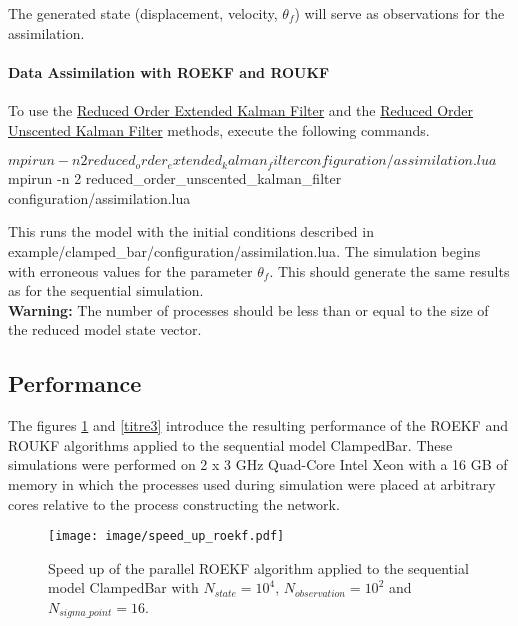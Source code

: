 \documentclass{tufte-book}
\begin{document}
\-The generated state (displacement, velocity, $ \theta_{f} $) will serve as observations for the assimilation.



\hypertarget{par-seq-example-dam}{}\paragraph{Data Assimilation with ROEKF and ROUKF}\label{par-seq-example-dam}


\-To use the \hyperlink{reduced_order_extended_kalman_filter}{\-Reduced \-Order \-Extended \-Kalman \-Filter} and the \hyperlink{reduced_order_unscented_kalman_filter}{\-Reduced \-Order \-Unscented \-Kalman \-Filter} methods, execute the following commands.
\begin{frame_bash}
$ mpirun -n 2 reduced_order_extended_kalman_filter configuration/assimilation.lua
$ mpirun -n 2 reduced_order_unscented_kalman_filter configuration/assimilation.lua
\end{frame_bash}
  \-This runs the model with the initial conditions described in {\ttfamily example/clamped\-\_\-bar/configuration/assimilation.\-lua}. \-The simulation begins with erroneous values for the parameter $ \theta_f $. \-This should generate the same results as for the sequential simulation.\\


  \textbf{Warning:}  The number of processes should be less than or equal to the size of the reduced model state vector.



\hypertarget{par-seq-performance}{}\subsection{Performance}\label{par-seq-performance}

The figures \ref{titre2} and \ref{titre3} introduce the resulting performance of the ROEKF and ROUKF algorithms applied to the sequential model ClampedBar. These simulations were performed on 2 x 3 GHz Quad-Core Intel Xeon with a 16 GB of memory in which the processes used during simulation were placed at arbitrary cores relative to the process constructing the network.

\begin{figure}
    \caption{\label{titre2} Speed up of the parallel ROEKF algorithm applied to the sequential model ClampedBar with $N_{state} = 10^4$, $N_{observation} = 10^2$ and $N_{sigma\_point} = 16$.}

 \texttt{[image: image/speed\_up\_roekf.pdf]}

   \end{figure}
\end{document}
